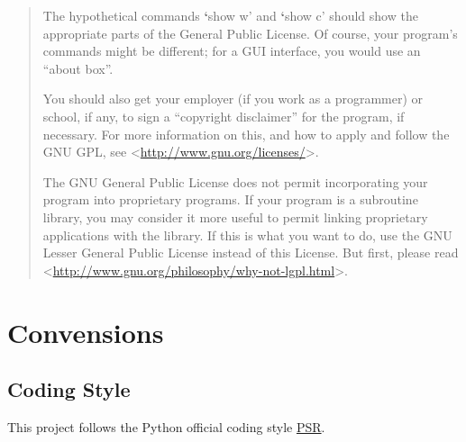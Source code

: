\documentclass[letterpaper,10pt,english]{sphinxmanual}
\begin{document}
\begin{quote}
The hypothetical commands {\color{red}\bfseries{}{}`}show w' and {\color{red}\bfseries{}{}`}show c' should show the appropriate
parts of the General Public License.  Of course, your program's commands
might be different; for a GUI interface, you would use an ``about box''.

You should also get your employer (if you work as a programmer) or school,
if any, to sign a ``copyright disclaimer'' for the program, if necessary.
For more information on this, and how to apply and follow the GNU GPL, see
\textless{}\href{http://www.gnu.org/licenses/}{http://www.gnu.org/licenses/}\textgreater{}.

The GNU General Public License does not permit incorporating your program
into proprietary programs.  If your program is a subroutine library, you
may consider it more useful to permit linking proprietary applications with
the library.  If this is what you want to do, use the GNU Lesser General
Public License instead of this License.  But first, please read
\textless{}\href{http://www.gnu.org/philosophy/why-not-lgpl.html}{http://www.gnu.org/philosophy/why-not-lgpl.html}\textgreater{}.
\end{quote}


\section{Convensions}
\label{docs/convensions:convensions}\label{docs/convensions::doc}

\subsection{Coding Style}
\label{docs/convensions:coding-style}
This project follows the Python official coding style \href{http://www.php-fig.org/psr/}{PSR}.
\end{document}
